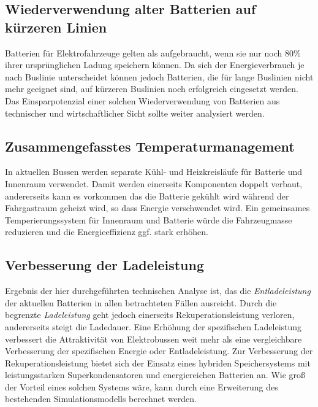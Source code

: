 \subsection{Wiederverwendung alter Batterien auf kürzeren Linien}
Batterien für Elektrofahrzeuge gelten als aufgebraucht, wenn sie nur noch 80\% ihrer ursprünglichen Ladung speichern können. Da sich der Energieverbrauch je nach Buslinie unterscheidet können jedoch Batterien, die für lange Buslinien nicht mehr geeignet sind, auf kürzeren Buslinien noch erfolgreich eingesetzt werden. Das Einsparpotenzial einer solchen Wiederverwendung von Batterien aus technischer und wirtschaftlicher Sicht sollte weiter analysiert werden.

\subsection{Zusammengefasstes Temperaturmanagement}
In aktuellen Bussen werden separate Kühl- und Heizkreisläufe für Batterie und Innenraum verwendet. Damit werden einerseits Komponenten doppelt verbaut, andererseits kann es vorkommen das die Batterie gekühlt wird während der Fahrgastraum geheizt wird, so dass Energie verschwendet wird. Ein gemeinsames Temperierungssystem für Innenraum und Batterie würde die Fahrzeugmasse reduzieren und die Energieeffizienz ggf. stark erhöhen.

\subsection{Verbesserung der Ladeleistung}
Ergebnis der hier durchgeführten technischen Analyse ist, das die \emph{Entladeleistung} der aktuellen Batterien in allen betrachteten Fällen ausreicht. Durch die begrenzte \emph{Ladeleistung} geht jedoch einerseits Rekuperationsleistung verloren, andererseits steigt die Ladedauer. Eine Erhöhung der spezifischen Ladeleistung verbessert die Attraktivität von Elektrobussen weit mehr als eine vergleichbare Verbesserung der spezifischen Energie oder Entladeleistung. Zur Verbesserung der Rekuperationsleistung bietet sich der Einsatz eines hybriden Speichersystems mit leistungsstarken Superkondensatoren und energiereichen Batterien an. Wie groß der Vorteil eines solchen Systems wäre, kann durch eine Erweiterung des bestehenden Simulationsmodells berechnet werden.